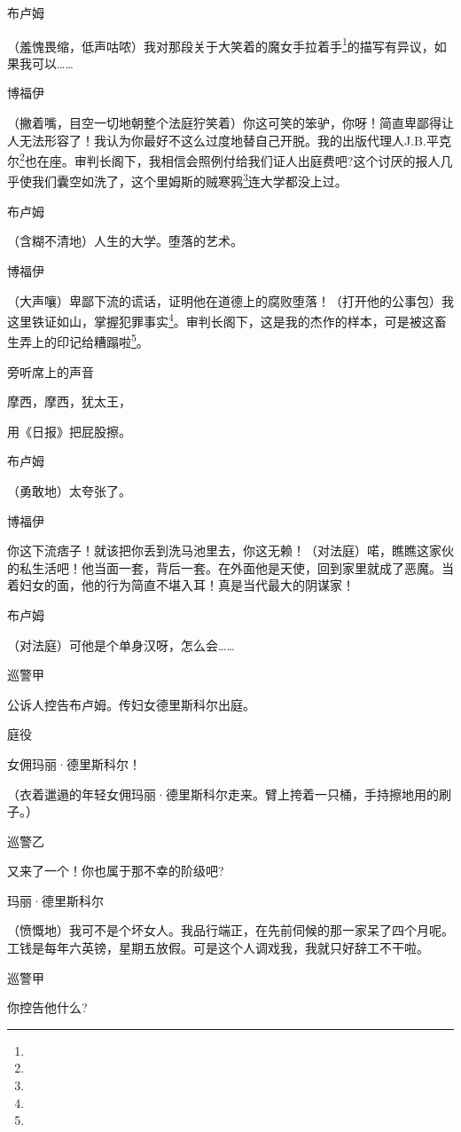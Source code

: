 \par 布卢姆
\par （羞愧畏缩，低声咕哝）我对那段关于大笑着的魔女手拉着手\footnote{}的描写有异议，如果我可以……
\par 博福伊
\par （撇着嘴，目空一切地朝整个法庭狞笑着）你这可笑的笨驴，你呀！简直卑鄙得让人无法形容了！我认为你最好不这么过度地替自己开脱。我的出版代理人J.B.平克尔\footnote{}也在座。审判长阁下，我相信会照例付给我们证人出庭费吧?这个讨厌的报人几乎使我们囊空如洗了，这个里姆斯的贼寒鸦\footnote{}连大学都没上过。
\par 布卢姆
\par （含糊不清地）人生的大学。堕落的艺术。
\par 博福伊
\par （大声嚷）卑鄙下流的谎话，证明他在道德上的腐败堕落！（打开他的公事包）我这里铁证如山，掌握犯罪事实\footnote{}。审判长阁下，这是我的杰作的样本，可是被这畜生弄上的印记给糟蹋啦\footnote{}。
\par 旁听席上的声音
\par 摩西，摩西，犹太王，
\par 用《日报》把屁股擦。
\par 布卢姆
\par （勇敢地）太夸张了。
\par 博福伊
\par 你这下流痞子！就该把你丢到洗马池里去，你这无赖！（对法庭）喏，瞧瞧这家伙的私生活吧！他当面一套，背后一套。在外面他是天使，回到家里就成了恶魔。当着妇女的面，他的行为简直不堪入耳！真是当代最大的阴谋家！
\par 布卢姆
\par （对法庭）可他是个单身汉呀，怎么会……
\par 巡警甲
\par 公诉人控告布卢姆。传妇女德里斯科尔出庭。
\par 庭役
\par 女佣玛丽·德里斯科尔！
\par （衣着邋遢的年轻女佣玛丽·德里斯科尔走来。臂上挎着一只桶，手持擦地用的刷子。）
\par 巡警乙
\par 又来了一个！你也属于那不幸的阶级吧?
\par 玛丽·德里斯科尔
\par （愤慨地）我可不是个坏女人。我品行端正，在先前伺候的那一家呆了四个月呢。工钱是每年六英镑，星期五放假。可是这个人调戏我，我就只好辞工不干啦。
\par 巡警甲
\par 你控告他什么?
